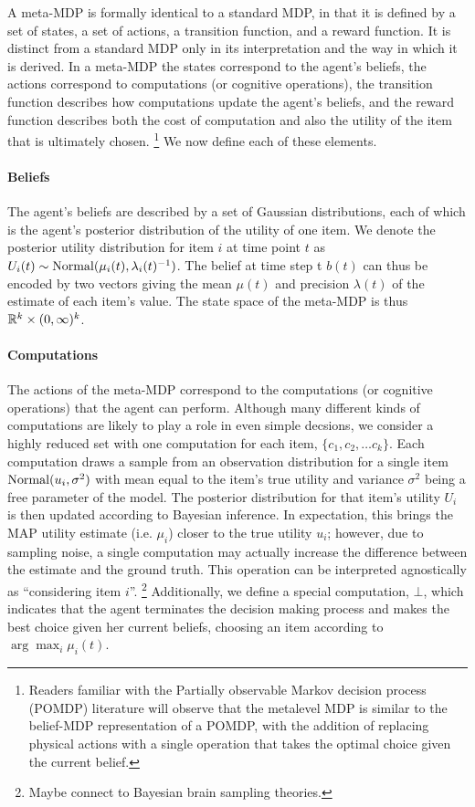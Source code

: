 \documentclass[12pt,a4paperpaper,]{article}
\begin{document}
A meta-MDP is formally identical to a standard MDP, in that it is defined by a set of states, a set of actions, a transition function, and a reward function. It is distinct from a standard MDP only in its interpretation and the way in which it is derived. In a meta-MDP the states correspond to the agent's beliefs, the actions correspond to computations (or cognitive operations), the transition function describes how computations update the agent's beliefs, and the reward function describes both the cost of computation and also the utility of the item that is ultimately chosen.%
  \footnote{Readers familiar with the Partially observable Markov decision process (POMDP) literature will observe that the metalevel MDP is similar to the belief-MDP representation of a POMDP, with the addition of replacing physical actions with a single operation that takes the optimal choice given the current belief.}
We now define each of these elements.


\paragraph{Beliefs}
The agent's beliefs are described by a set of Gaussian distributions, each of which is the agent's posterior distribution of the utility of one item. We denote the posterior utility distribution for item $i$ at time point $t$ as $U_i(t) \sim \mathrm{Normal}(\mu_i(t), \lambda_i(t)^{-1})$. The belief at time step t $b(t)$ can thus be encoded by two vectors giving the mean $\mu(t)$ and precision $\lambda(t)$ of the estimate of each item's value. The state space of the meta-MDP is thus $\mathbb{R}^k \times (0,\infty)^k$.

\paragraph{Computations}
The actions of the meta-MDP correspond to the computations (or cognitive operations) that the agent can perform. Although many different kinds of computations are likely to play a role in even simple decsions, we consider a highly reduced set with one computation for each item, $\{c_1, c_2, \dots c_k \}$. Each computation draws a sample from an observation distribution for a single item $\mathrm{Normal}(u_i, \sigma^2)$ with mean equal to the item's true utility and variance $\sigma^2$ being a free parameter of the model. The posterior distribution for that item's utility $U_i$ is then updated according to Bayesian inference. In expectation, this brings the MAP utility estimate (i.e. $\mu_i$) closer to the true utility $u_i$; however, due to sampling noise, a single computation may actually increase the difference between the estimate and the ground truth. This operation can be interpreted agnostically as ``considering item $i$''.%
  \footnote{Maybe connect to Bayesian brain sampling theories.}
Additionally, we define a special computation, $\bot$, which indicates that the agent terminates the decision making process and makes the best choice given her current beliefs, choosing an item according to $\arg\max_i \mu_i(t)$.
\end{document}
